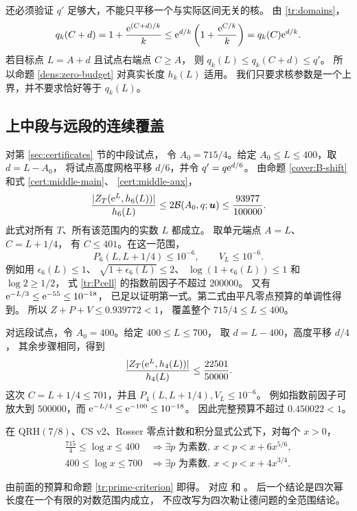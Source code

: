 还必须验证 $q'$ 足够大，不能只平移一个与实际区间无关的核。
由 \eqref{tr:domains}，
\begin{equation}\label{cover:q-valid}
 q_k(C+d)=1+\frac{\mathrm e^{(C+d)/k}}k
 \leq\mathrm e^{d/k}\left(1+\frac{\mathrm e^{C/k}}k\right)=q_k(C)\mathrm e^{d/k}.
\end{equation}
若目标点 $L=A+d$ 且试点右端点 $C\geq A$，
则 $q_k(L)\leq q_k(C+d)\leq q'$。
所以命题 \ref{dens:zero-budget} 对真实长度 $h_k(L)$ 适用。
我们只要求核参数是一个上界，并不要求恰好等于 $q_k(L)$。

\subsection{上中段与远段的连续覆盖}

对第 \ref{sec:certificates} 节的中段试点，
令 $A_0=715/4$。给定
$A_0\leq L\leq400$，取 $d=L-A_0$，
将试点高度网格平移 $d/6$，并令 $q'=q\mathrm e^{d/6}$。
由命题 \ref{cover:B-shift} 和式 \eqref{cert:middle-main}、
\eqref{cert:middle-aux}，
\begin{equation}\label{cover:upper-zero}
 \frac{|Z_T(\mathrm e^L,h_6(L))|}{h_6(L)}
 \leq2\mathcal B(A_0,q;\boldsymbol u)
 \leq\frac{93977}{100000}.
\end{equation}
此式对所有 $T$、所有该范围内的实数 $L$ 都成立。
取单元端点 $A=L$、$C=L+1/4$，
有 $C\leq401$。在这一范围，
\begin{equation}\label{cover:upper-small}
 P_6(L,L+1/4)\leq10^{-6},\qquad V_L\leq10^{-6}.
\end{equation}
例如用 $\epsilon_6(L)\leq1$、
$\sqrt{1+\epsilon_6(L)}\leq2$、
$\log(1+\epsilon_6(L))\leq1$ 和 $\log2\geq1/2$，
式 \eqref{tr:Pcell} 的指数前因子不超过 $200000$。
又有 $\mathrm e^{-L/3}\leq\mathrm e^{-55}\leq10^{-18}$，
已足以证明第一式。第二式由平凡零点预算的单调性得到。
所以 $Z+P+V\leq0.939772<1$，
覆盖整个 $715/4\leq L\leq400$。

对远段试点，令 $A_0=400$。给定 $400\leq L\leq700$，
取 $d=L-400$，高度平移 $d/4$，
其余步骤相同，得到
\[
 \frac{|Z_T(\mathrm e^L,h_4(L))|}{h_4(L)}
 \leq\frac{22501}{50000}.
\]
这次 $C=L+1/4\leq701$，并且
$P_4(L,L+1/4),V_L\leq10^{-6}$。
例如指数前因子可放大到 $500000$，而
$\mathrm e^{-L/4}\leq\mathrm e^{-100}\leq10^{-18}$。
因此完整预算不超过 $0.450022<1$。

\begin{proposition}[两个向上覆盖区间]\label{cover:upper-ranges}
在 QRH$(7/8)$、CS v2、Rosser 零点计数和积分显式公式下，对每个 $x>0$，
\begin{align*}
 \frac{715}{4}\leq\log x\leq400
 &\Longrightarrow\exists p\text{ 为素数},\
                         x<p<x+6x^{5/6},\\
 400\leq\log x\leq700
 &\Longrightarrow\exists p\text{ 为素数},\
                         x<p<x+4x^{3/4}.
\end{align*}
\end{proposition}
由前面的预算和命题 \ref{tr:prime-criterion} 即得。
对应
和 。
后一个结论是四次幂长度在一个有限的对数范围内成立，
不应改写为四次勒让德问题的全范围结论。

